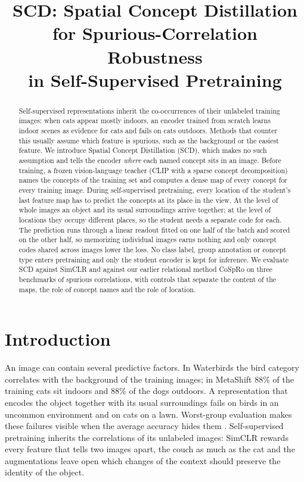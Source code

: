\documentclass{article}
\title{SCD: Spatial Concept Distillation\\for Spurious-Correlation Robustness\\in Self-Supervised Pretraining}
\author{}
\begin{document}
\maketitle
\lhead{}

\begin{abstract}
Self-supervised representations inherit the co-occurrences of their unlabeled training images: when cats appear mostly indoors, an encoder trained from scratch learns indoor scenes as evidence for cats and fails on cats outdoors. Methods that counter this usually assume which feature is spurious, such as the background or the easiest feature. We introduce Spatial Concept Distillation (SCD), which makes no such assumption and tells the encoder \emph{where} each named concept sits in an image. Before training, a frozen vision-language teacher (CLIP with a sparse concept decomposition) names the concepts of the training set and computes a dense map of every concept for every training image. During self-supervised pretraining, every location of the student's last feature map has to predict the concepts at its place in the view. At the level of whole images an object and its usual surroundings arrive together; at the level of locations they occupy different places, so the student needs a separate code for each. The prediction runs through a linear readout fitted on one half of the batch and scored on the other half, so memorizing individual images earns nothing and only concept codes shared across images lower the loss. No class label, group annotation or concept type enters pretraining and only the student encoder is kept for inference. We evaluate SCD against SimCLR and against our earlier relational method CoSpRo on three benchmarks of spurious correlations, with controls that separate the content of the maps, the role of concept names and the role of location.
\end{abstract}

\section{Introduction}
An image can contain several predictive factors. In Waterbirds the bird category correlates with the background of the training images; in MetaShift 88\% of the training cats sit indoors and 88\% of the dogs outdoors. A representation that encodes the object together with its usual surroundings fails on birds in an uncommon environment and on cats on a lawn. Worst-group evaluation makes these failures visible when the average accuracy hides them \citep{sagawa2020groupdro}. Self-supervised pretraining inherits the correlations of its unlabeled images: SimCLR rewards every feature that tells two images apart, the couch as much as the cat \citep{chen2020simclr} and the augmentations leave open which changes of the context should preserve the identity of the object.
\end{document}
